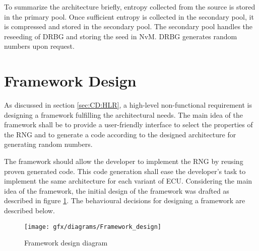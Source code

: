To summarize the architecture briefly, entropy collected from the source is stored in the primary pool. Once sufficient entropy is collected in the secondary pool, it is compressed and stored in the secondary pool. The secondary pool handles the reseeding of DRBG and storing the seed in NvM. DRBG generates random numbers upon request.

%
%
\section{Framework Design}
\label{sec:CD:FD}
As discussed in section \ref{sec:CD:HLR}, a high-level non-functional requirement is designing a framework fulfilling the architectural needs. The main idea of the framework shall be to provide a user-friendly interface to select the properties of the RNG and to generate a code according to the designed architecture for generating random numbers. 

The framework should allow the developer to implement the RNG by reusing proven generated code. This code generation shall ease the developer's task to implement the same architecture for each variant of ECU. Considering the main idea of the framework, the initial design of the framework was drafted as described in figure \ref{fig:4:12}. The behavioural decisions for designing a framework are described below.

\begin{figure}[!h]
	\centering
	\texttt{[image: gfx/diagrams/Framework\_design]}
	\caption{Framework design diagram}
	\label{fig:4:12}
\end{figure} 

